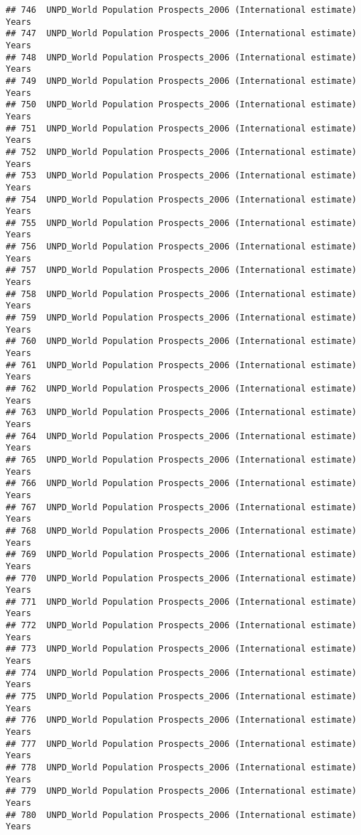 \documentclass[]{article}
\begin{document}
\begin{verbatim}
## 746  UNPD_World Population Prospects_2006 (International estimate) Years
## 747  UNPD_World Population Prospects_2006 (International estimate) Years
## 748  UNPD_World Population Prospects_2006 (International estimate) Years
## 749  UNPD_World Population Prospects_2006 (International estimate) Years
## 750  UNPD_World Population Prospects_2006 (International estimate) Years
## 751  UNPD_World Population Prospects_2006 (International estimate) Years
## 752  UNPD_World Population Prospects_2006 (International estimate) Years
## 753  UNPD_World Population Prospects_2006 (International estimate) Years
## 754  UNPD_World Population Prospects_2006 (International estimate) Years
## 755  UNPD_World Population Prospects_2006 (International estimate) Years
## 756  UNPD_World Population Prospects_2006 (International estimate) Years
## 757  UNPD_World Population Prospects_2006 (International estimate) Years
## 758  UNPD_World Population Prospects_2006 (International estimate) Years
## 759  UNPD_World Population Prospects_2006 (International estimate) Years
## 760  UNPD_World Population Prospects_2006 (International estimate) Years
## 761  UNPD_World Population Prospects_2006 (International estimate) Years
## 762  UNPD_World Population Prospects_2006 (International estimate) Years
## 763  UNPD_World Population Prospects_2006 (International estimate) Years
## 764  UNPD_World Population Prospects_2006 (International estimate) Years
## 765  UNPD_World Population Prospects_2006 (International estimate) Years
## 766  UNPD_World Population Prospects_2006 (International estimate) Years
## 767  UNPD_World Population Prospects_2006 (International estimate) Years
## 768  UNPD_World Population Prospects_2006 (International estimate) Years
## 769  UNPD_World Population Prospects_2006 (International estimate) Years
## 770  UNPD_World Population Prospects_2006 (International estimate) Years
## 771  UNPD_World Population Prospects_2006 (International estimate) Years
## 772  UNPD_World Population Prospects_2006 (International estimate) Years
## 773  UNPD_World Population Prospects_2006 (International estimate) Years
## 774  UNPD_World Population Prospects_2006 (International estimate) Years
## 775  UNPD_World Population Prospects_2006 (International estimate) Years
## 776  UNPD_World Population Prospects_2006 (International estimate) Years
## 777  UNPD_World Population Prospects_2006 (International estimate) Years
## 778  UNPD_World Population Prospects_2006 (International estimate) Years
## 779  UNPD_World Population Prospects_2006 (International estimate) Years
## 780  UNPD_World Population Prospects_2006 (International estimate) Years

\end{verbatim}
\end{document}
